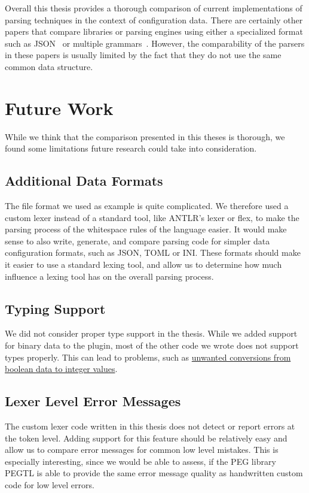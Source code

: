 Overall this thesis provides a thorough comparison of current implementations of parsing techniques in the context of configuration data. There are certainly other papers that compare libraries or parsing engines using either a specialized format such as JSON~\cite{json2019geoff} or multiple grammars~\cite{chen2011full, flodin2014packrat}. However, the comparability of the parsers in these papers is usually limited by the fact that they do not use the same common data structure.

\section{Future Work}

While we think that the comparison presented in this theses is thorough, we found some limitations future research could take into consideration.

\subsection{Additional Data Formats}

The  file format we used as example is quite complicated. We therefore used a custom lexer instead of a standard tool, like ANTLR’s lexer or flex, to make the parsing process of the whitespace rules of the language easier. It would make sense to also write, generate, and compare parsing code for simpler data configuration formats, such as JSON, TOML or INI. These formats should make it easier to use a standard lexing tool, and allow us to determine how much influence a lexing tool has on the overall parsing process.

\subsection{Typing Support}

We did not consider proper type support in the thesis. While we added support for binary data to the \LinkYAMLCPP{} plugin, most of the other code we wrote does not support types properly. This can lead to problems, such as \href{https://issues.libelektra.org/2833}{unwanted conversions from boolean data to integer values}.

\subsection{Lexer Level Error Messages}

The custom lexer code written in this thesis does not detect or report errors at the token level. Adding support for this feature should be relatively easy and allow us to compare error messages for common low level mistakes. This is especially interesting, since we would be able to assess, if the PEG library \gls{PEGTL} is able to provide the same error message quality as handwritten custom code for low level errors.

